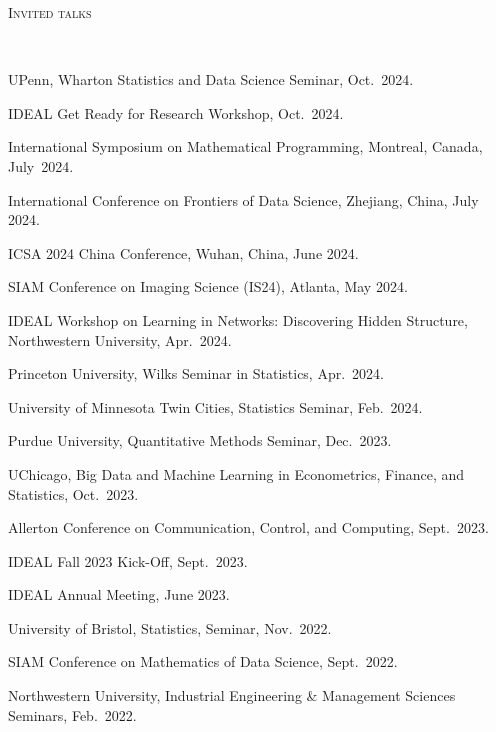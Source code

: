 \documentclass[a4paper, 10pt]{article}
\newenvironment{changemargin}[2]{%
  \begin{list}{}{%
    \setlength{\topsep}{0pt}%
    \setlength{\leftmargin}{#1}%
    \setlength{\rightmargin}{#2}%
    \setlength{\listparindent}{\parindent}%
    \setlength{\itemindent}{\parindent}%
    \setlength{\parsep}{\parskip}%
  }%
  \item[]}{\end{list}
}
\newcommand{\lineover}{
	\begin{changemargin}{-0.05in}{-0.05in}
		\vspace*{-8pt}
		\hrulefill \\
		\vspace*{-2pt}
	\end{changemargin}
}
\newcommand{\header}[1]{
	\begin{changemargin}{-0.5in}{-0.5in}
		\scshape{#1}\\
  	\lineover
	\end{changemargin}
}
\newenvironment{body} {
	\vspace*{-16pt}
	\begin{changemargin}{-0.3in}{-0.5in}
  }	
	{\end{changemargin}
}
\begin{document}
\bigskip
\header{\LARGE{Invited talks}}
\begin{body}
	\vspace{18pt}
	\begin{enumerate}[label={[{T}{{\arabic*}}]}]
	
	\item UPenn, Wharton Statistics and Data Science Seminar, Oct.~2024.
	\item IDEAL Get Ready for Research Workshop, Oct.~2024.
	\item International Symposium on Mathematical Programming, Montreal, Canada, July~2024.
	\item International Conference on Frontiers of Data Science, Zhejiang, China, July 2024.
	\item ICSA 2024 China Conference, Wuhan, China, June 2024.

	\item SIAM Conference on Imaging Science (IS24), Atlanta, May 2024.

	\item IDEAL Workshop on Learning in Networks: Discovering Hidden Structure, Northwestern University, Apr.~2024.
	
	\item Princeton University, Wilks Seminar in Statistics, Apr.~2024.
	
	\item University of Minnesota Twin Cities, Statistics Seminar, Feb.~2024.
	\item Purdue University, Quantitative Methods Seminar, Dec.~2023.
	\item UChicago, Big Data and Machine Learning in Econometrics, Finance, and Statistics, Oct.~2023.
	\item Allerton Conference on Communication, Control, and Computing, Sept.~2023.
	
	\item IDEAL Fall 2023 Kick-Off, Sept.~2023.
	
	\item IDEAL Annual Meeting, June 2023.
	
	\item University of Bristol, Statistics, Seminar, Nov.~2022. 
	
	\item SIAM Conference on Mathematics of Data Science, Sept.~2022.
	
	\item Northwestern University, Industrial Engineering \& Management Sciences Seminars, Feb.~2022.
	

\end{enumerate}
\end{body}
\end{document}
